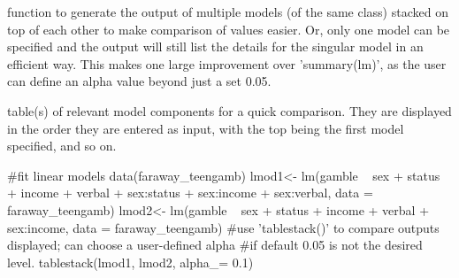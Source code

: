 \documentclass[a4paper]{book}
\begin{document}
%
\begin{Details}
function to generate the output of multiple models (of the same class) stacked on top of each other to make comparison of values easier. Or, only one model can be specified and the output
will still list the details for the singular model in an efficient way. This makes one large improvement over 'summary(lm)', as the user can define an alpha value beyond just a set 0.05.
\end{Details}
%
\begin{Value}
table(s) of relevant model components for a quick comparison. They are displayed in the order they are entered as input, with the top being the first model specified, and so on.
\end{Value}
%
\begin{Examples}
\begin{ExampleCode}
#fit linear models
data(faraway_teengamb)
lmod1<- lm(gamble ~ sex + status + income + verbal + sex:status + sex:income + sex:verbal, data = faraway_teengamb)
lmod2<- lm(gamble ~ sex + status + income + verbal + sex:income, data = faraway_teengamb)
#use 'tablestack()' to compare outputs displayed; can choose a user-defined alpha
#if default 0.05 is not the desired level.
 tablestack(lmod1, lmod2, alpha_= 0.1)

\end{ExampleCode}
\end{Examples}
\printindex{}
\end{document}
